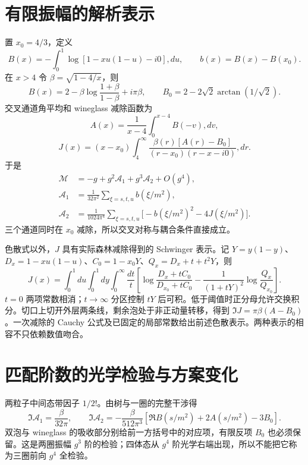 \documentclass[11pt,a4paper,oneside]{ctexrep}
\theoremstyle{cnplain}
\theoremstyle{definition}
\theoremstyle{remark}
\begin{document}
\section{有限振幅的解析表示}
置 $x_0=4/3$，定义
\begin{equation}
 B(x)=-\int_0^1\log[1-xu(1-u)-i0],du,\qquad b(x)=B(x)-B(x_0).
\end{equation}
在 $x>4$ 令 $\beta=\sqrt{1-4/x}$，则
\begin{equation}
 B(x)=2-\beta\log\frac{1+\beta}{1-\beta}+i\pi\beta,\qquad
 B_0=2-2\sqrt2\arctan(1/\sqrt2).
\end{equation}
交叉通道角平均和 wineglass 减除函数为
\begin{equation}
 A(x)=\frac1{x-4}\int_0^{x-4}B(-v),dv,
\end{equation}
\begin{equation}
 J(x)=(x-x_0)\int_4^\infty
 \frac{\beta(r)[A(r)-B_0]}{(r-x_0)(r-x-i0)},dr.
\end{equation}
于是
\begin{equation}
\begin{aligned}
 \mathcal M&=-g+g^2\mathcal A_1+g^3\mathcal A_2+O(g^4),\\
 \mathcal A_1&=\frac1{32\pi^2}\sum_{\xi=s,t,u}b(\xi/m^2),\\
 \mathcal A_2&=\frac1{1024\pi^4}\sum_{\xi=s,t,u}
 \bigl[-b(\xi/m^2)^2-4J(\xi/m^2)\bigr].
\end{aligned}
\end{equation}
三个通道同时在 $x_0$ 减除，所以交叉对称与耦合条件直接成立。

色散式以外，$J$ 具有实际森林减除得到的 Schwinger 表示。记 $Y=y(1-y)$、$D_x=1-xu(1-u)$、$C_0=1-x_0Y$、$Q_x=D_x+t+t^2Y$，则
\begin{equation}
 J(x)=\int_0^1du\int_0^1dy\int_0^\infty\frac{dt}{t}
 \left[\log\frac{D_x+tC_0}{D_{x_0}+tC_0}
 -\frac1{(1+tY)^2}\log\frac{Q_x}{Q_{x_0}}\right].
\end{equation}
$t=0$ 两项常数相消；$t\to\infty$ 分区控制 $tY$ 后可积。低于阈值时正分母允许交换积分。切口上切开外层两条线，剩余泡处于非正动量转移，得到 $\Im J=\pi\beta(A-B_0)$。一次减除的 Cauchy 公式及已固定的局部常数给出前述色散表示。两种表示的相容不只依赖数值吻合。

\section{匹配阶数的光学检验与方案变化}
两粒子中间态带因子 $1/2!$。由树与一圈的完整干涉得
\begin{equation}
 \Im\mathcal A_1=\frac{\beta}{32\pi},\qquad
 \Im\mathcal A_2=-\frac{\beta}{512\pi^3}
 [\Re B(s/m^2)+2A(s/m^2)-3B_0].
\end{equation}
双泡与 wineglass 的吸收部分别给前一方括号中的对应项，有限反项 $B_0$ 也必须保留。这是两圈振幅 $g^3$ 阶的检验；四体态从 $g^4$ 阶光学右端出现，所以不能把它称为三圈前向 $g^4$ 全检验。
\end{document}
